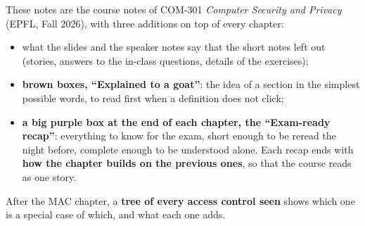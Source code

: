\documentclass[11pt,a4paper,openany]{book}
\begin{document}
\raggedbottom


\tableofcontents
\clearpage

These notes are the course notes of COM-301 \emph{Computer Security and Privacy} (EPFL, Fall
2026), with three additions on top of every chapter:
\begin{itemize}
  \item what the slides and the speaker notes say that the short notes left out (stories,
        answers to the in-class questions, details of the exercises);
  \item \textbf{brown boxes, ``Explained to a goat''}: the idea of a section in the simplest
        possible words, to read first when a definition does not click;
  \item \textbf{a big purple box at the end of each chapter, the ``Exam-ready recap''}: everything
        to know for the exam, short enough to be reread the night before, complete enough to be
        understood alone. Each recap ends with \textbf{how the chapter builds on the previous
        ones}, so that the course reads as one story.
\end{itemize}
After the MAC chapter, a \textbf{tree of every access control seen} shows which one is a special
case of which, and what each one adds.











\end{document}
